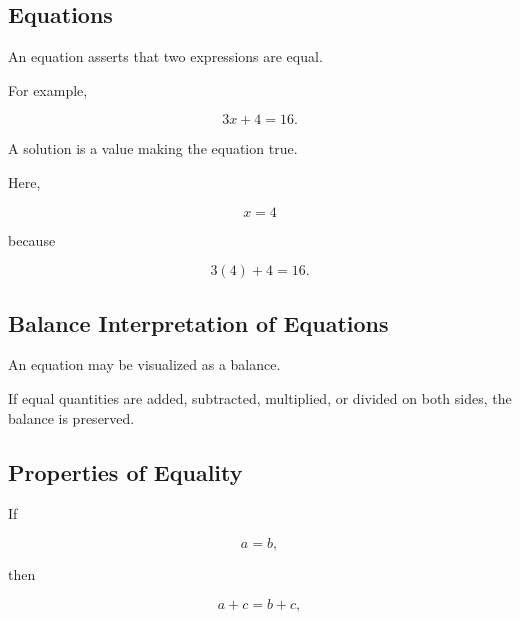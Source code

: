 \subsection{Equations}
\label{subsec:elementary-equations}

An equation asserts that two expressions are equal.

For example,

\[ 3x+4=16. \]

A solution is a value making the equation true.

Here,

\[ x=4 \]

because

\[ 3(4)+4=16. \]

\subsection{Balance Interpretation of Equations}
\label{subsec:balance-equations}

An equation may be visualized as a balance.

\begin{center}
\end{center}

If equal quantities are added, subtracted, multiplied, or divided on both
sides, the balance is preserved.

\subsection{Properties of Equality}
\label{subsec:properties-of-equality}

If

\[ a=b, \]

then

\[ a+c=b+c, \]

